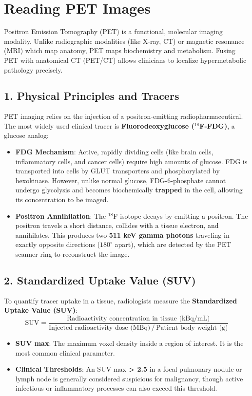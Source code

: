 \chapter{Reading PET Images}

\label{ch:read_pet}

Positron Emission Tomography (PET) is a functional, molecular imaging modality. Unlike radiographic modalities (like X-ray, CT) or magnetic resonance (MRI) which map anatomy, PET maps biochemistry and metabolism. Fusing PET with anatomical CT (PET/CT) allows clinicians to localize hypermetabolic pathology precisely.


\section*{1. Physical Principles and Tracers}
PET imaging relies on the injection of a positron-emitting radiopharmaceutical. The most widely used clinical tracer is \textbf{Fluorodeoxyglucose ($^{18}$F-FDG)}, a glucose analog:

\begin{itemize}
    \item \textbf{FDG Mechanism}: Active, rapidly dividing cells (like brain cells, inflammatory cells, and cancer cells) require high amounts of glucose. FDG is transported into cells by GLUT transporters and phosphorylated by hexokinase. However, unlike normal glucose, FDG-6-phosphate cannot undergo glycolysis and becomes biochemically \textbf{trapped} in the cell, allowing its concentration to be imaged.
    \item \textbf{Positron Annihilation}: The $^{18}$F isotope decays by emitting a positron. The positron travels a short distance, collides with a tissue electron, and annihilates. This produces two \textbf{511 keV gamma photons} traveling in exactly opposite directions ($180^\circ$ apart), which are detected by the PET scanner ring to reconstruct the image.
\end{itemize}


\section*{2. Standardized Uptake Value (SUV)}
To quantify tracer uptake in a tissue, radiologists measure the \textbf{Standardized Uptake Value (SUV)}:
$$\text{SUV} = \frac{\text{Radioactivity concentration in tissue (kBq/mL)}}{\text{Injected radioactivity dose (MBq)} \,/\, \text{Patient body weight (g)}}$$

\begin{itemize}
    \item \textbf{SUV max}: The maximum voxel density inside a region of interest. It is the most common clinical parameter.
    \item \textbf{Clinical Thresholds}: An SUV max \textbf{> 2.5} in a focal pulmonary nodule or lymph node is generally considered suspicious for malignancy, though active infectious or inflammatory processes can also exceed this threshold.
\end{itemize}


